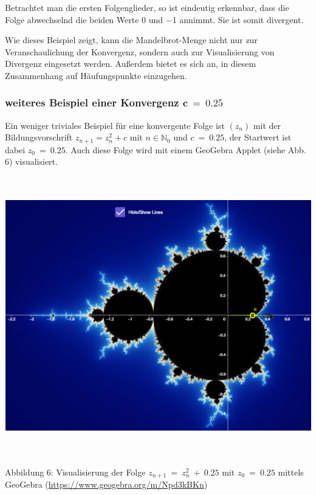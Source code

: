 \documentclass{book}
\begin{document}
Betrachtet man die ersten Folgenglieder, so ist eindeutig erkennbar,
dass die Folge abwechselnd die beiden Werte 0 und \(-\)1 annimmt. Sie
ist somit divergent.

Wie dieses Beispiel zeigt, kann die Mandelbrot-Menge nicht nur zur
Veranschaulichung der Konvergenz, sondern auch zur Visualisierung von
Divergenz eingesetzt werden. Außerdem bietet es sich an, in diesem
Zusammenhang auf Häufungspunkte einzugehen.

\hypertarget{weiteres-beispiel-einer-konvergenz-mathbfc-0.25}{%
\subsubsection{\texorpdfstring{weiteres Beispiel einer Konvergenz
\(\mathbf{c\  = \ 0.25}\)}{weiteres Beispiel einer Konvergenz \textbackslash mathbf\{c\textbackslash{}  = \textbackslash{} 0.25\}}}\label{weiteres-beispiel-einer-konvergenz-mathbfc-0.25}}

Ein weniger triviales Beispiel für eine konvergente Folge ist
\(\left( z_{n} \right)\) mit der Bildungsvorschrift
\(z_{n + 1} = z_{n}^{2} + c\) mit \(n \in \mathbb{N}_{0}\) und
\(c\  = \ 0.25\), der Startwert ist dabei \(z_{0}\  = \ 0.25\). Auch
diese Folge wird mit einem GeoGebra Applet (siehe Abb. 6) visualisiert.

\includegraphics[width=6.33858in,height=4.77468in]{image11.png}

\protect\hypertarget{_Toc167901656}{}{}Abbildung 6: Visualisierung der
Folge \(z_{n + 1}\  = \ z_{n}^{2}\  + \ 0.25\) mit \(z_{0}\  = \ 0.25\)
mittels GeoGebra (\url{https://www.geogebra.org/m/Npd3kBKn})
\end{document}
